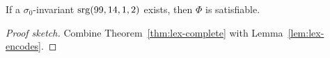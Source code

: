 \begin{theorem}\label{thm:encoding-complete}
If a $\sigma_0$-invariant $\mathrm{srg}(99,14,1,2)$ exists, then $\Phi$ is
satisfiable.
\leanok
{}
\end{theorem}

\begin{proof}[Proof sketch]
Combine Theorem~\ref{thm:lex-complete} with Lemma~\ref{lem:lex-encodes}.
\end{proof}

